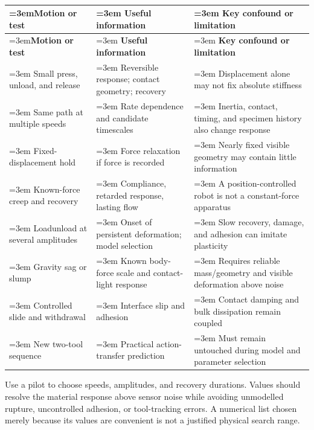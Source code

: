 \documentclass[
  11pt,
]{article}
\begin{document}
\begin{small}
\begin{longtable}{@{}>{\raggedright\sloppy\emergencystretch=3em\arraybackslash}p{} >{\raggedright\sloppy\emergencystretch=3em\arraybackslash}p{} >{\raggedright\sloppy\emergencystretch=3em\arraybackslash}p{}@{}}
\caption{}\\
\toprule
\textbf{Motion or test} & \textbf{Useful information} & \textbf{Key confound or limitation} \\
\midrule
\endfirsthead
\toprule
\textbf{Motion or test} & \textbf{Useful information} & \textbf{Key confound or limitation} \\
\midrule
\endhead
Small press, unload, and release & Reversible response; contact geometry; recovery & Displacement alone may not fix absolute stiffness \\
\hline
Same path at multiple speeds & Rate dependence and candidate timescales & Inertia, contact, timing, and specimen history also change response \\
\hline
Fixed-displacement hold & Force relaxation if force is recorded & Nearly fixed visible geometry may contain little information \\
\hline
Known-force creep and recovery & Compliance, retarded response, lasting flow & A position-controlled robot is not a constant-force apparatus \\
\hline
Load\textendash{}\allowbreak{}unload at several amplitudes & Onset of persistent deformation; model selection & Slow recovery, damage, and adhesion can imitate plasticity \\
\hline
Gravity sag or slump & Known body-force scale and contact-light response & Requires reliable mass/geometry and visible deformation above noise \\
\hline
Controlled slide and withdrawal & Interface slip and adhesion & Contact damping and bulk dissipation remain coupled \\
\hline
New two-tool sequence & Practical action-transfer prediction & Must remain untouched during model and parameter selection \\
\bottomrule
\end{longtable}
\end{small}

Use a pilot to choose speeds, amplitudes, and recovery durations. Values
should resolve the material response above sensor noise while avoiding
unmodelled rupture, uncontrolled adhesion, or tool-tracking errors. A
numerical list chosen merely because its values are convenient is not a
justified physical search range.
\end{document}
